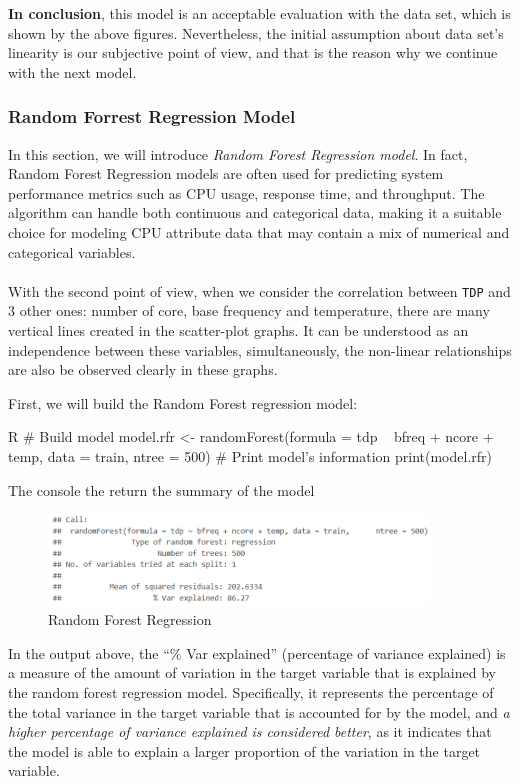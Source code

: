 \textbf{In conclusion}, this model is an acceptable evaluation with the data set, which is shown by the above figures. Nevertheless, the initial assumption about data set's linearity is our subjective point of view, and that is the reason why we continue with the next model.


\subsubsection{Random Forrest Regression Model}
\label{section:data_analysis_randomforrest}
In this section, we will introduce \emph{Random Forest Regression model}. In fact, Random Forest Regression models are often used for predicting system performance metrics such as CPU usage, response time, and throughput. The algorithm can handle both continuous and categorical data, making it a suitable choice for modeling CPU attribute data that may contain a mix of numerical and categorical variables.\\\\
With the second point of view, when we consider the correlation between \verb|TDP| and 3 other ones: number of core, base frequency and temperature, there are many vertical lines created in the scatter-plot graphs. It can be understood as an independence between these variables, simultaneously, the non-linear relationships are also be observed clearly in these graphs.

First, we will build the Random Forest regression model:
\begin{code}{R}
# Build model
model.rfr <- randomForest(formula = tdp ~ bfreq + ncore + temp, data = train, ntree = 500)
# Print model's information
print(model.rfr)
\end{code}

The console the return the summary of the model
\begin{figure}[H]
    \centering
    \includegraphics[width = 0.9\textwidth]{graphics/randomSum.png}
    \caption{Random Forest Regression}
    \label{fig:randomForest}
\end{figure}

In the output above, the “$\%$ Var explained” (percentage of variance explained) is a measure of the amount of variation in the target variable that is explained by the random forest regression model. Specifically, it represents the percentage of the total variance in the target variable that is accounted for by the model, and \textit{a higher percentage of variance explained is considered better}, as it indicates that the model is able to explain a larger proportion of the variation in the target variable.

